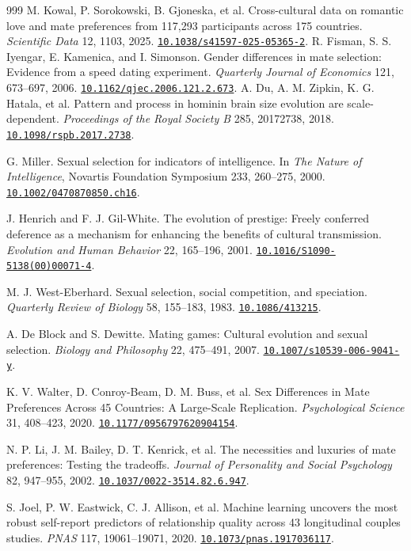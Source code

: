 \documentclass[10pt,twocolumn,letterpaper]{article}
\newcommand{\doi}[1]{\href{https://doi.org/#1}{\nolinkurl{#1}}}
\begin{document}
\begin{thebibliography}{999}
 M. Kowal, P. Sorokowski, B. Gjoneska, et al. Cross-cultural data on romantic love and mate preferences from 117,293 participants across 175 countries. \emph{Scientific Data} 12, 1103, 2025. \doi{10.1038/s41597-025-05365-2}.
 R. Fisman, S. S. Iyengar, E. Kamenica, and I. Simonson. Gender differences in mate selection: Evidence from a speed dating experiment. \emph{Quarterly Journal of Economics} 121, 673--697, 2006. \doi{10.1162/qjec.2006.121.2.673}.
 A. Du, A. M. Zipkin, K. G. Hatala, et al. Pattern and process in hominin brain size evolution are scale-dependent. \emph{Proceedings of the Royal Society B} 285, 20172738, 2018. \doi{10.1098/rspb.2017.2738}.

 G. Miller. Sexual selection for indicators of intelligence. In \emph{The Nature of Intelligence}, Novartis Foundation Symposium 233, 260--275, 2000. \doi{10.1002/0470870850.ch16}.

 J. Henrich and F. J. Gil-White. The evolution of prestige: Freely conferred deference as a mechanism for enhancing the benefits of cultural transmission. \emph{Evolution and Human Behavior} 22, 165--196, 2001. \doi{10.1016/S1090-5138(00)00071-4}.

 M. J. West-Eberhard. Sexual selection, social competition, and speciation. \emph{Quarterly Review of Biology} 58, 155--183, 1983. \doi{10.1086/413215}.

 A. De Block and S. Dewitte. Mating games: Cultural evolution and sexual selection. \emph{Biology and Philosophy} 22, 475--491, 2007. \doi{10.1007/s10539-006-9041-y}.

 K. V. Walter, D. Conroy-Beam, D. M. Buss, et al. Sex Differences in Mate Preferences Across 45 Countries: A Large-Scale Replication. \emph{Psychological Science} 31, 408--423, 2020. \doi{10.1177/0956797620904154}.

 N. P. Li, J. M. Bailey, D. T. Kenrick, et al. The necessities and luxuries of mate preferences: Testing the tradeoffs. \emph{Journal of Personality and Social Psychology} 82, 947--955, 2002. \doi{10.1037/0022-3514.82.6.947}.

 S. Joel, P. W. Eastwick, C. J. Allison, et al. Machine learning uncovers the most robust self-report predictors of relationship quality across 43 longitudinal couples studies. \emph{PNAS} 117, 19061--19071, 2020. \doi{10.1073/pnas.1917036117}.


\end{thebibliography}
\end{document}
